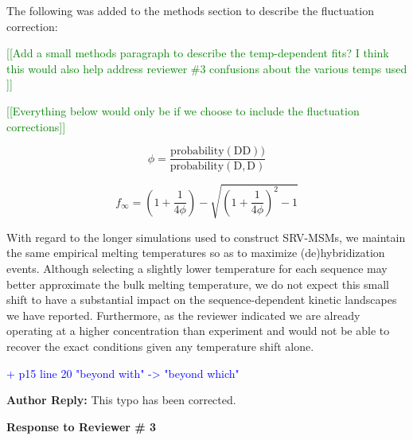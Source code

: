 \documentclass[11pt,a4paper]{letter} %
\newcommand*{\rood}[1]{{\color{red}{#1}}}
\newcommand*{\noteg}[1]{\textcolor{green}{[[#1]]}}		%
\begin{document}
The following was added to the methods section to describe the fluctuation correction:

\noteg{Add a small methods paragraph to describe the temp-dependent fits? I think this would also help address reviewer \#3 confusions about the various temps used }

\noteg{Everything below would only be if we choose to include the fluctuation corrections}

\rood{The following calculates the dimer fraction in bulk solution from simulations performed in a periodic box. We apply this to the dissociation fraction in order to better compare with the experimental slow response. We compute these values from the dimer fraction (DD) and monomer fraction (D, D).}

    \begin{equation}\label{}
    \phi = \frac{\mathrm{probability (DD))}}{\mathrm{probability (D, D)}}
    \end{equation}
    
    \begin{equation}\label{}
	f_{\infty} = (1+\frac{1}{4\phi}) - \sqrt{(1+\frac{1}{4\phi})^2 - 1}
	\end{equation}

With regard to the longer simulations used to construct SRV-MSMs, we maintain the same empirical melting temperatures so as to maximize (de)hybridization events. Although selecting a slightly lower temperature for each sequence may better approximate the bulk melting temperature, we do not expect this small shift to have a substantial impact on the sequence-dependent kinetic landscapes we have reported. Furthermore, as the reviewer indicated we are already operating at a higher concentration than experiment and would not be able to recover the exact conditions given any temperature shift alone.

\textcolor{blue}{+ p15 line 20 "beyond with" -> "beyond which"}

\textbf{Author Reply:}    This typo has been corrected.

\begin{shaded}
\textbf{Response to Reviewer \# 3}
\end{shaded}
\end{document}
